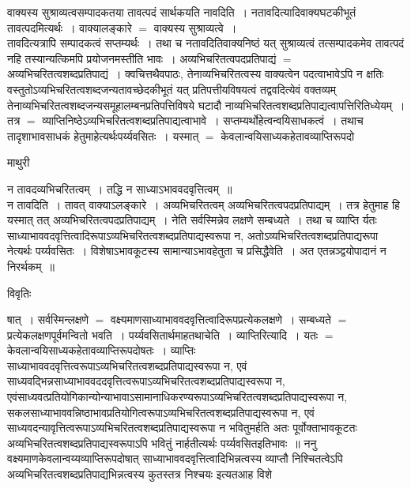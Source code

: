 \documentclass[10pt, openany]{book}
\begin{document}
{वाक्यस्य सुश्राव्यत्वसम्पादकतया तावत्पदं सार्थकयति नावदिति~। नतावदित्यादिवाक्यघटकीभूतं तावत्पदमित्यर्थः~। वाक्यालङ्कारे $=$ वाक्यस्य  सुश्राव्यत्वे~।\\

तावदित्यत्रापि सम्पादकत्वं सप्तम्यर्थः~। तथा च नतावदितिवाक्यनिष्ठं यत् सुश्राव्यत्वं तत्सम्पादकमेव तावत्पदं नहि तस्यान्यत्किमपि प्रयोजनमस्तीति भावः~। अव्यभिचरितत्वपदप्रतिपाद्यं $=$ अव्यभिचरितत्वशब्दप्रतिपाद्यं~। क्वचित्तथैवपाठः, तेनाव्यभिचरितत्वस्य वाक्यत्वेन पदत्वाभावेऽपि न क्षतिः~ वस्तुतोऽव्यभिचरितत्वशब्दजन्यतावच्छेदकीभूतं यत् प्रतिपत्तीयविषयत्वं तद्ववदित्येवं वक्तव्यम् तेनाव्यभिचरितत्वशब्दजन्यसमूहालम्बनप्रतिपत्तिविषये घटादौ नाव्यभिचरितत्वशब्दप्रतिपाद्यत्वापत्तिरितिध्येयम्~। तत्र $=$ व्याप्तिनिष्ठेऽव्यभिचरितत्वशब्दप्रतिपाद्यत्वाभावे~। सप्तम्यर्थोहेत्वन्वयिसाधकत्वं~। तथाच
तादृशाभावसाधकं हेतुमाहेत्यर्थःपर्य्यवसितः~। यस्मात् $=$ केवलान्वयिसाध्यकहेतावव्याप्तिरूपदो
\newpage
\begin{center}  माथुरी  \end{center}
{\la
न तावदव्यभिचरितत्वम्~। तद्धि न साध्याऽभाववदवृत्तित्वम्~॥}\\

{\la न तावदिति~।} तावत् वाक्याऽलङ्कारे~। अव्यभिचरितत्वम् अव्यभिचरितत्वपदप्रतिपाद्यम्~। तत्र हेतुमाह  हि यस्मात् तत् अव्यभिचरितत्वपदप्रतिपाद्यम्~। नेति सर्वस्मिन्नेव लक्षणे सम्बध्यते~। तथा च व्याप्ति र्यतः साध्याभाववदवृत्तित्वादिरूपाऽव्यभिचरितत्वशब्दप्रतिपाद्यस्वरूपा न, अतोऽव्यभिचरितत्वशब्दप्रतिपाद्यरूपा नेत्यर्थः पर्य्यवसितः~। विशेषाऽभावकूटस्य सामान्याऽभावहेतुता च प्रसिद्धैवेति~। अत एतन्नञ्द्वयोपादानं न निरर्थकम्~॥
\begin{center}     विवृतिः \end{center}
षात्~। सर्वस्मिन्लक्षणे $=$ वक्ष्यमाणसाध्याभाववदवृत्तित्वादिरूपप्रत्येकलक्षणे~। सम्बध्यते $=$ प्रत्येकलक्षणपूर्वमन्वितो भवति~। पर्य्यवसितार्थमाह\textendash तथाचेति~।
व्याप्तिरित्यादि~। यतः $=$ केवलान्वयिसाध्यकहेतावव्याप्तिरूपदोषतः~। व्याप्तिः साध्याभाववदवृत्तित्वरूपाऽव्यभिचरितत्वशब्दप्रतिपाद्यस्वरूपा न, एवं
साध्यवद्भिन्नसाध्याभाववददवृत्तित्वरूपाऽव्यभिचरितत्वशब्दप्रतिपाद्यस्वरूपा न, एवंसाध्यवत्प्रतियोगिकान्योन्याभावाऽसामानाधिकरण्यरूपाऽव्यभिचरितत्वशब्दप्रतिपाद्यस्वरूपा न, सकलसाध्याभाववन्निष्ठाभावप्रतियोगित्वरूपाऽव्यभिचरितत्वशब्दप्रतिपाद्यस्वरूपा न, एवं
साध्यवदन्यावृत्तित्वरूपाऽव्यभिचरितत्वशब्दप्रतिपाद्यस्वरूपा न भवितुमर्हति अतः पूर्वोक्ताभावकूटतः अव्यभिचरितत्वशब्दप्रतिपाद्यस्वरूपाऽपि भवितुं नार्हतीत्यर्थः पर्य्यवसितइतिभावः~॥ ननु वक्ष्यमाणकेवलान्वय्यव्याप्तिरूपदोषात् साध्याभाववदवृत्तित्वादिभिन्नत्वस्य व्याप्तौ निश्चितत्वेऽपि अव्यभिचरितत्वशब्दप्रतिपाद्यभिन्नत्वस्य कुतस्तत्र निश्चयः इत्यतआह विशे

}
\end{document}
